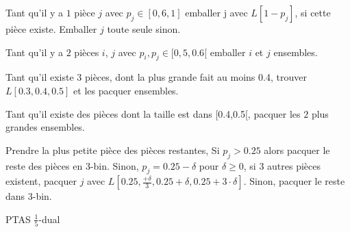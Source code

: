 \documentclass[a4paper,12pt]{report}
\theoremstyle{plain}				%
\theoremstyle{definition}				%
\begin{document}
\begin{algorithm}[H]
\DontPrintSemicolon

Tant qu'il y a $1$ pièce $j$ avec $p_j \in [0,6, 1]$ emballer j avec
$L[1 - p_j]$, si cette pièce existe.
Emballer $j$ toute seule sinon.

\BlankLine %
Tant qu'il y a $2$ pièces $i$, $j$ avec $p_i, p_j \in [0,5, 0.6[$
emballer $i$ et $j$ ensembles.

\BlankLine %
Tant qu'il existe $3$ pièces, dont la plus grande fait au moins 0.4,
trouver $L[0.3,0.4,0.5]$ et les pacquer ensembles.

\BlankLine %
Tant qu'il existe des pièces dont la taille est dans [0.4,0.5[, pacquer
les $2$ plus grandes ensembles.

\BlankLine %
Prendre la plus petite pièce des pièces restantes, Si $p_j > 0.25$
alors pacquer le reste des pièces en 3-bin.
Sinon, $p_j = 0.25 - \delta$ pour $\delta \geq 0$,
 si $3$ autres pièces existent, pacquer $j$
 avec $L[0.25, \frac{+\delta}{3}, 0.25 + \delta, 0.25 + 3 \cdot \delta]$.
Sinon, pacquer le reste dans 3-bin.


\caption{PTAS $\frac{1}{5}$-dual}
\label{algo:PTASDual1_5}
\end{algorithm}

\bigskip
\end{document}
